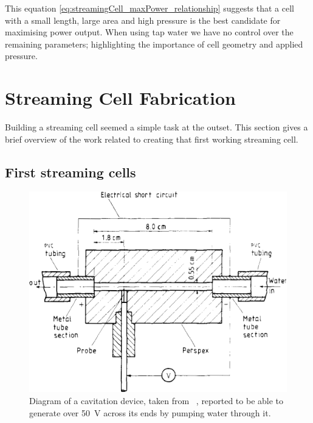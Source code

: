       This equation \eqref{eq:streamingCell_maxPower_relationship} suggests that a cell with a small length, large area and high pressure is the best candidate for maximising power output.
      When using tap water we have no control over the remaining parameters; highlighting the importance of cell geometry and applied pressure.


\section{Streaming Cell Fabrication}
  \label{sect:part1_energyHarvesting_buildingStreamingCells}


  Building a streaming cell seemed a simple task at the outset.
  This section gives a brief overview of the work related to creating that first working streaming cell.


  \subsection{First streaming cells}


    \begin{figure}
      \centering
      \includegraphics{content/pt1/01-PowerHarvesting/graphics/VargaSeymour1986_cell}
      \caption[Diagram of a cavitation device, taken from ~\cite{Varga1986}]{\label{fig:first_cell_diagram}Diagram of a cavitation device, taken from ~\cite{Varga1986}, reported to be able to generate over \SI{50}{\volt} across its ends by pumping water through it.}
    \end{figure}

